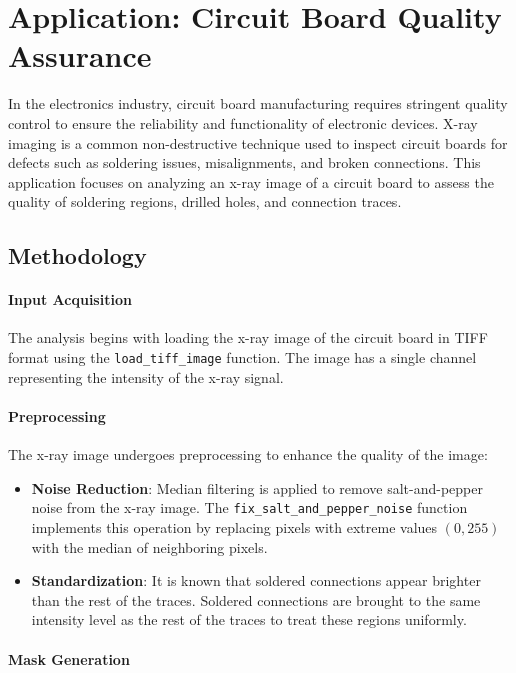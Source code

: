 \documentclass[a4paper,12pt]{article}
\begin{document}
\newpage

\section{Application: Circuit Board Quality Assurance}

In the electronics industry, circuit board manufacturing requires stringent quality control to ensure the reliability and functionality of electronic devices. X-ray imaging is a common non-destructive technique used to inspect circuit boards for defects such as soldering issues, misalignments, and broken connections. This application focuses on analyzing an x-ray image of a circuit board to assess the quality of soldering regions, drilled holes, and connection traces.

\subsection{Methodology}

\paragraph{Input Acquisition}

The analysis begins with loading the x-ray image of the circuit board in TIFF format using the \texttt{load\_tiff\_image} function. The image has a single channel representing the intensity of the x-ray signal.

\paragraph{Preprocessing}

The x-ray image undergoes preprocessing to enhance the quality of the image:
\begin{itemize}
    \item \textbf{Noise Reduction}: Median filtering is applied to remove salt-and-pepper noise from the x-ray image. The \texttt{fix\_salt\_and\_pepper\_noise} function implements this operation by replacing pixels with extreme values \((0, 255)\) with the median of neighboring pixels.
    \item \textbf{Standardization}: It is known that soldered connections appear brighter than the rest of the traces. Soldered connections are brought to the same intensity level as the rest of the traces to treat these regions uniformly.
\end{itemize}

\paragraph{Mask Generation}
\end{document}
